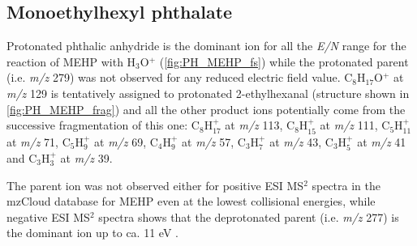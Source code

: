 
\subsection{Monoethylhexyl phthalate}




Protonated phthalic anhydride is the dominant ion for all the \textit{E/N} range for the reaction of MEHP with H$_3$O$^+$ (\autoref{fig:PH_MEHP_fs}) while the protonated parent (i.e. \textit{m/z} 279) was not observed for any reduced electric field value.
%
C$_8$H$_{17}$O$^+$ at \textit{m/z} 129 is tentatively assigned to protonated 2-ethylhexanal (structure shown in \autoref{fig:PH_MEHP_frag}) and all the other product ions potentially come from the successive fragmentation of this one:
C$_8$H$_{17}^+$ at \textit{m/z} 113,
C$_8$H$_{15}^+$ at \textit{m/z} 111,
C$_5$H$_{11}^+$ at \textit{m/z} 71,
C$_5$H$_9^+$ at \textit{m/z} 69,
C$_4$H$_9^+$ at \textit{m/z} 57,
C$_3$H$_7^+$ at \textit{m/z} 43,
C$_3$H$_5^+$ at \textit{m/z} 41
and
C$_3$H$_3^+$ at \textit{m/z} 39.

The parent ion was not observed either for positive ESI MS$^2$ spectra in the mzCloud database for MEHP even at the lowest collisional energies, while negative ESI MS$^2$ spectra shows that the deprotonated parent (i.e. \textit{m/z} 277) is the dominant ion up to ca. 11 eV \cite{mzcloudMEHP}.









